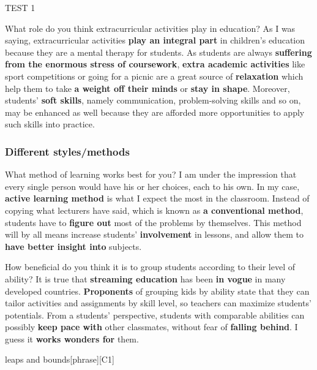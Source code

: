 \documentclass[a4paper,12pt]{article}
\begin{document}
\begin{glossarymc}[Cambridge 3]
\begin{test}{TEST 1}
\begin{qa}{What role do you think extracurricular activities play in education?}
    As I was saying, extracurricular activities \textbf{play an integral part} in children's education because they are a mental therapy for students. 
    As students are always \textbf{suffering from the enormous stress of coursework}, \textbf{extra academic activities} like sport competitions or going for a picnic are a great source of \textbf{relaxation} which help them to take \textbf{a weight off their minds} or \textbf{stay in shape}. 
    Moreover, students' \textbf{soft skills}, namely communication, problem-solving skills and so on, may be enhanced as well because they are afforded more opportunities to apply such skills into practice.
\end{qa}

\subsubsection*{Different styles/methods}

\begin{qa}{What method of learning works best for you?}
    I am under the impression that every single person would have his or her choices, each to his own. 
    In my case, \textbf{active learning method} is what I expect the most in the classroom. 
    Instead of copying what lecturers have said, which is known as \textbf{a conventional method}, students have to \textbf{figure out} most of the problems by themselves. 
    This method will by all means increase students' \textbf{involvement} in lessons, and allow them to \textbf{have better insight into} subjects.
\end{qa}

\begin{qa}{How beneficial do you think it is to group students according to their level of ability?}
    It is true that \textbf{streaming education} has been \textbf{in vogue} in many developed countries. 
    \textbf{Proponents} of grouping kids by ability state that they can tailor activities and assignments by skill level, so teachers can maximize students' potentials. 
    From a students' perspective, students with comparable abilities can possibly \textbf{keep pace with} other classmates, without fear of \textbf{falling behind}. 
    I guess it \textbf{works wonders for} them.
\end{qa}

\begin{VocabExplain}[Part 3]
    \begin{ExplainCard}{leaps and bounds}[phrase][C1]
\end{ExplainCard}


\end{VocabExplain}
\end{test}
\end{glossarymc}
\end{document}
